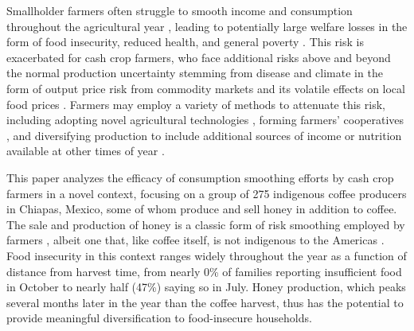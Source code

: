 \documentclass[../main.tex]{subfiles}
\begin{document}
Smallholder farmers often struggle to smooth income and consumption throughout the agricultural year \parencite{morduchIncomeSmoothingConsumption1995}, leading to potentially large welfare losses in the form of food insecurity, reduced health, and general poverty \parencite{banerjeeEconomicLivesPoor2007}. This risk is exacerbated for cash crop farmers, who face additional risks above and beyond the normal production uncertainty stemming from disease and climate in the form of output price risk from commodity markets and its volatile effects on local food prices \parencite{boydMicroeconomicsAgriculturalPrice2020}. Farmers may employ a variety of methods to attenuate this risk, including adopting novel agricultural technologies \parencite{federAdoptionAgriculturalInnovations1985}, forming farmers' cooperatives \parencite{bizikovaScopingReviewContributions2020}, and diversifying production to include additional sources of income or nutrition available at other times of year \parencite{baconBeanAnalyzingDiversified2023}. 

This paper analyzes the efficacy of consumption smoothing efforts by cash crop farmers in a novel context, focusing on a group of 275 indigenous coffee producers in Chiapas, Mexico, some of whom produce and sell honey in addition to coffee. The sale and production of honey is a classic form of risk smoothing employed by farmers \parencite{anderzenEffectsOnfarmDiversification2020}, albeit one that, like coffee itself, is not indigenous to the Americas \parencite{goulsonEffectsIntroducedBees2003}.  Food insecurity in this context ranges widely throughout the year as a function of distance from harvest time, from nearly 0\% of families reporting insufficient food in October to nearly half (47\%) saying so in July. Honey production, which peaks several months later in the year than the coffee harvest, thus has the potential to provide meaningful diversification to food-insecure households.
\end{document}
